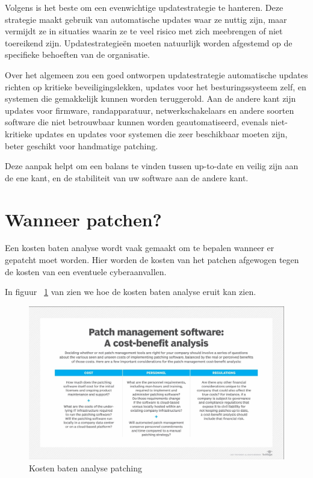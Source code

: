 Volgens \textcite{Tozzi2017} is het beste om een evenwichtige updatestrategie te hanteren. Deze strategie maakt gebruik van automatische updates waar ze nuttig zijn, maar vermijdt ze in situaties waarin ze te veel risico met zich meebrengen
 of niet toereikend zijn. Updatestrategieën moeten natuurlijk worden afgestemd op de specifieke behoeften van de organisatie.

Over het algemeen zou een goed ontworpen updatestrategie automatische updates richten op kritieke beveiligingslekken, updates voor het besturingssysteem zelf, en systemen die gemakkelijk kunnen worden teruggerold. Aan de andere kant 
zijn updates voor firmware, randapparatuur, netwerkschakelaars en andere soorten software die niet betrouwbaar kunnen worden geautomatiseerd, evenals niet-kritieke updates en updates voor systemen die zeer beschikbaar moeten zijn, beter geschikt voor handmatige patching.

Deze aanpak helpt om een balans te vinden tussen up-to-date en veilig zijn aan de ene kant, en de stabiliteit van uw software aan de andere kant.

\section{Wanneer patchen?}
Een kosten baten analyse wordt vaak gemaakt om te bepalen wanneer er gepatcht moet worden. Hier worden de kosten van het patchen afgewogen tegen de kosten van een eventuele cyberaanvallen.

In figuur ~\ref{fig:kostenbaten} van \textcite{Posey2024} zien we hoe de kosten baten analyse eruit kan zien.

\begin{figure}[h]
    \centering
    \includegraphics[width=\textwidth]{techtarget.jpg}
    \caption{Kosten baten analyse patching \autocite{Posey2024}}
    \label{fig:kostenbaten}
\end{figure}

